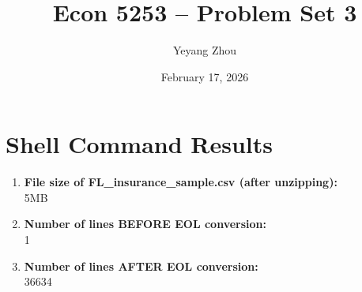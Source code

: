 \documentclass{article}
\title{Econ 5253 -- Problem Set 3}
\author{Yeyang Zhou}
\date{February 17, 2026}
\begin{document}
\maketitle

\section*{Shell Command Results}

\begin{enumerate}
    \item \textbf{File size of FL\_insurance\_sample.csv (after unzipping):}\\
    5MB

    \item \textbf{Number of lines BEFORE EOL conversion:}\\
    1

    \item \textbf{Number of lines AFTER EOL conversion:}\\
    36634
\end{enumerate}
\end{document}
